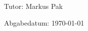 \documentclass[%
pdftex,
oneside,			%
11pt,				%
parskip=half,		%
headheight = 12pt,	%
headsepline,		%
footsepline,		%
footheight = 16pt,	%
abstracton,		%
DIV=calc,		%
BCOR=8mm,		%
headinclude=false,	%
footinclude=false,	%
listof=totoc,		%
toc=bibliography,	%
]{scrreprt}	%
\def \datumAbgabe {\today}
\def \tutor {Markus Pak}
\begin{document}
\begin{titlepage}
        \vspace*{10mm}
        
        \begin{large} 
        \begin{center}
        Tutor: \tutor 
        \end{center}
        \end{large}         
        \vspace*{-6mm}
        
        \begin{large} 
        \begin{center}
        Abgabedatum: \datumAbgabe
        \end{center}
        \end{large} 
\end{titlepage}
\end{document}
